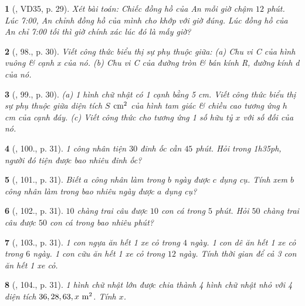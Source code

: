 \documentclass{article}
\newtheorem{baitoan}{}
\begin{document}
\begin{baitoan}[\cite{Binh_Toan_7_tap_1}, VD35, p. 29]
	Xét bài toán: Chiếc đồng hồ của An mỗi giờ chậm $12$ phút. Lúc {\rm7:00}, An chỉnh đồng hồ của mình cho khớp với giờ đúng. Lúc đồng hồ của An chỉ {\rm7:00} tối thì giờ chính xác lúc đó là mấy giờ? 
\end{baitoan}

\begin{baitoan}[\cite{Binh_Toan_7_tap_1}, 98., p. 30]
	Viết công thức biểu thị sự phụ thuộc giữa: (a) Chu vi C của hình vuông \& cạnh x của nó. (b) Chu vi C của đường tròn \& bán kính R, đường kính d của nó.
\end{baitoan}

\begin{baitoan}[\cite{Binh_Toan_7_tap_1}, 99., p. 30]
	(a) 1 hình chữ nhật có 1 cạnh bằng {\rm5 cm}. Viết công thức biểu thị sự phụ thuộc giữa diện tích $S$ $\rm cm^2$ của hình tam giác \& chiều cao tương ứng $h$ {\rm cm} của cạnh đáy. (c) Viết công thức cho tương ứng 1 số hữu tỷ $x$ với số đối của nó.
\end{baitoan}

\begin{baitoan}[\cite{Binh_Toan_7_tap_1}, 100., p. 31]
	1 công nhân tiện $30$ đinh ốc cần $45$ phút. Hỏi trong {\rm1h35ph}, người đó tiện được bao nhiêu đinh ốc?
\end{baitoan}

\begin{baitoan}[\cite{Binh_Toan_7_tap_1}, 101., p. 31]
	Biết $a$ công nhân làm trong $b$ ngày được $c$ dụng cụ. Tính xem $b$ công nhân làm trong bao nhiêu ngày được $a$ dụng cụ?
\end{baitoan}

\begin{baitoan}[\cite{Binh_Toan_7_tap_1}, 102., p. 31]
	$10$ chàng trai câu được $10$ con cá trong $5$ phút. Hỏi $50$ chàng trai câu được $50$ con cá trong bao nhiêu phút?
\end{baitoan}

\begin{baitoan}[\cite{Binh_Toan_7_tap_1}, 103., p. 31]
	1 con ngựa ăn hết 1 xe cỏ trong $4$ ngày. 1 con dê ăn hết 1 xe cỏ trong $6$ ngày. 1 con cữu ăn hết 1 xe cỏ trong $12$ ngày. Tính thời gian để cả 3 con ăn hết 1 xe cỏ.
\end{baitoan}

\begin{baitoan}[\cite{Binh_Toan_7_tap_1}, 104., p. 31]
	1 hình chữ nhật lớn được chia thành 4 hình chữ nhật nhỏ với 4 diện tích $36,28,63,x\ {\rm m^2}$. Tính $x$.
\end{baitoan}
\end{document}
